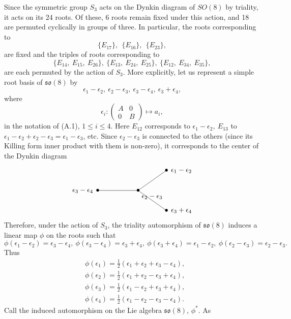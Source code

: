 \documentclass[12pt,letterpaper]{amsart}
\theoremstyle{plain}
\theoremstyle{definition}
\theoremstyle{remark}
\theoremstyle{definition}
\newcommand{\eps}{\epsilon}
\begin{document}
Since the symmetric group $S_3$ acts on the Dynkin diagram of $SO(8)$
by triality,
it acts on its 24 roots. Of these, 6 roots remain fixed under
this action, and 18 are permuted cyclically in groups of three. In
particular, the roots corresponding to
\[
\{E_{17}\},\ \ \{E_{16}\},\ \ \{E_{23}\},
\]
are fixed and the triples of roots corresponding to
\[
\{E_{14},\ E_{15},\ E_{26}\},\ \{E_{13},\ E_{24},\ E_{25}\},
\ \{E_{12},\ E_{34},\ E_{35}\},
\]
are each permuted by the action of $S_3$. More explicitly, let us
represent a simple root basis of $\mathfrak{so}(8)$ by
\[
\eps_1 - \eps_2,\  \eps_2 - \eps_3,\ \eps_3 - \eps_4,\ \eps_3 + \eps_4,
\]
where
\[
\eps_i : \begin{pmatrix} A&0\\0&B\end{pmatrix}
\longmapsto a_i, \tag{A.10}
\]
in the notation of (A.1), $1 \leq i \leq 4$.
Here $E_{12}$ corresponds to $\eps_1 - \eps_2,\ E_{13}$ to
$\eps_1 - \eps_2 + \eps_2 - \eps_3 = \eps_1 - \eps_3$, etc. Since
$\eps_2 - \eps_3$ is connected to the others (since its Killing form inner
product with them is non-zero), it corresponds to the center of the
Dynkin diagram
\[
\begin{tikzpicture}[baseline=(c.base)]
\draw (0,0) -- (-2.0,0) (0,0) -- (1.4,1.0) (0,0) -- (1.4,-1.0);
\node (c) at (0,0) {$\bullet$};
\node[below right] at (0.05,-0.05) {$\eps_2-\eps_3$};
\node at (-2.0,0) {$\bullet$};
\node[left] at (-2.1,0) {$\eps_3-\eps_4$};
\node at (1.4,1.0) {$\bullet$};
\node[right] at (1.5,1.0) {$\eps_1-\eps_2$};
\node at (1.4,-1.0) {$\bullet$};
\node[right] at (1.5,-1.0) {$\eps_3+\eps_4$};
\end{tikzpicture}
\]
Therefore, under the action of $S_3$, the triality automorphism of
$\mathfrak{so}(8)$ induces a linear map $\phi$ on the roots such that
\[
\phi (\eps_1 - \eps_2) = \eps_3 - \eps_4,
\ \phi (\eps_3 - \eps_4) = \eps_3 + \eps_4,
\ \phi (\eps_3 + \eps_4) = \eps_1 - \eps_2,
\ \phi (\eps_2 - \eps_3) = \eps_2 - \eps_3.\tag{A.11}
\]
Thus
\[
\begin{split}
&\phi (\eps_1) = \frac{1}{{2}}(\eps_1 + \eps_2 + \eps_3 - \eps_4),\\
&\phi (\eps_2) = \frac{1}{{2}}(\eps_1 + \eps_2 - \eps_3 + \eps_4),\\
&\phi (\eps_3) = \frac{1}{{2}}(\eps_1 - \eps_2 + \eps_3 + \eps_4),\\
&\phi (\eps_4) = \frac{1}{{2}}(\eps_1 - \eps_2 - \eps_3 - \eps_4).
\end{split}
\]
Call the induced automorphism on the Lie algebra $\mathfrak{so}(8)$, $\phi^*$. As
\end{document}
